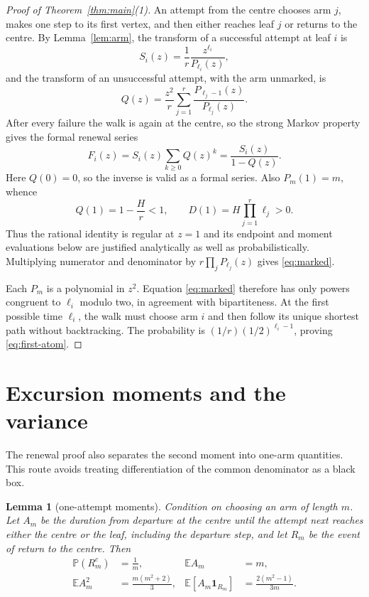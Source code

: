 \documentclass[a4paper,10pt]{amsart}
\newtheorem{lemma}[theorem]{Lemma}
\theoremstyle{remark}
\newcommand{\Prob}{\mathbb P}
\newcommand{\E}{\mathbb E}
\newcommand{\one}{\mathbf 1}
\begin{document}
\begin{proof}[Proof of Theorem~\ref{thm:main}(1)]
An attempt from the centre chooses arm $j$, makes one step to its first
vertex, and then either reaches leaf $j$ or returns to the centre.  By
Lemma~\ref{lem:arm}, the transform of a successful attempt at leaf $i$ is
\[
 S_i(z)=\frac1r\frac{z^{\ell_i}}{P_{\ell_i}(z)},
\]
and the transform of an unsuccessful attempt, with the arm unmarked, is
\[
 Q(z)=\frac{z^2}{r}\sum_{j=1}^r
            \frac{P_{\ell_j-1}(z)}{P_{\ell_j}(z)}.
\]
After every failure the walk is again at the centre, so the strong Markov
property gives the formal renewal series
\[
 F_i(z)=S_i(z)\sum_{k\ge0}Q(z)^k=\frac{S_i(z)}{1-Q(z)}.
\]
Here $Q(0)=0$, so the inverse is valid as a formal series.  Also
$P_m(1)=m$, whence
\[
 Q(1)=1-\frac Hr<1,
 \qquad D(1)=H\prod_{j=1}^r\ell_j>0.
\]
Thus the rational identity is regular at $z=1$ and its endpoint and moment
evaluations below are justified analytically as well as probabilistically.
Multiplying numerator and denominator by $r\prod_jP_{\ell_j}(z)$ gives
\eqref{eq:marked}.

Each $P_m$ is a polynomial in $z^2$.  Equation \eqref{eq:marked} therefore
has only powers congruent to $\ell_i$ modulo two, in agreement with
bipartiteness.  At the first possible time $\ell_i$, the walk must choose arm
$i$ and then follow its unique shortest path without backtracking.  The
probability is $(1/r)(1/2)^{\ell_i-1}$, proving \eqref{eq:first-atom}.
\end{proof}

\section{Excursion moments and the variance}\label{sec:moments}

The renewal proof also separates the second moment into one-arm quantities.
This route avoids treating differentiation of the common denominator as a
black box.

\begin{lemma}[one-attempt moments]\label{lem:attempt}
Condition on choosing an arm of length $m$.  Let $A_m$ be the duration from
departure at the centre until the attempt next reaches either the centre or
the leaf, including the departure step, and let $R_m$ be the event of return
to the centre.  Then
\begin{align}
 \Prob(R_m^c)&=\frac1m,&
 \E A_m&=m,\label{eq:attempt-first}\\
 \E A_m^2&=\frac{m(m^2+2)}3,&
 \E[A_m\one_{R_m}]&=\frac{2(m^2-1)}{3m}.
 \label{eq:attempt-second}
\end{align}
\end{lemma}
\end{document}
